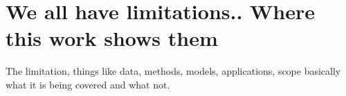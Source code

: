 \section{We all have limitations.. Where this work shows them}
The limitation, things like data, methods, models, applications, scope basically what it is being covered and what not.
%
%
%
%
%
%
%
%
%
